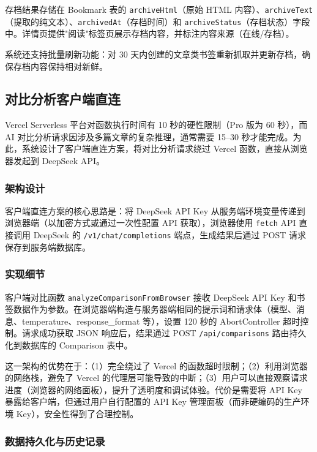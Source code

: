 \documentclass[12pt,a4paper]{ctexart}
\begin{document}
存档结果存储在 Bookmark 表的 \texttt{archiveHtml}（原始 HTML 内容）、\texttt{archiveText}（提取的纯文本）、\texttt{archivedAt}（存档时间）和 \texttt{archiveStatus}（存档状态）字段中。详情页提供"阅读"标签页展示存档内容，并标注内容来源（在线/存档）。

系统还支持批量刷新功能：对 30 天内创建的文章类书签重新抓取并更新存档，确保存档内容保持相对新鲜。

\subsection{对比分析客户端直连}

Vercel Serverless 平台对函数执行时间有 10 秒的硬性限制（Pro 版为 60 秒），而 AI 对比分析请求因涉及多篇文章的复杂推理，通常需要 15--30 秒才能完成。为此，系统设计了客户端直连方案，将对比分析请求绕过 Vercel 函数，直接从浏览器发起到 DeepSeek API。

\subsubsection{架构设计}

客户端直连方案的核心思路是：将 DeepSeek API Key 从服务端环境变量传递到浏览器端（以加密方式或通过一次性配置 API 获取），浏览器使用 \texttt{fetch} API 直接调用 DeepSeek 的 \texttt{/v1/chat/completions} 端点，生成结果后通过 POST 请求保存到服务端数据库。

\subsubsection{实现细节}

客户端对比函数 \texttt{analyzeComparisonFromBrowser} 接收 DeepSeek API Key 和书签数据作为参数。在浏览器端构造与服务器端相同的提示词和请求体（模型、消息、temperature、response\_format 等），设置 120 秒的 AbortController 超时控制。请求成功获取 JSON 响应后，结果通过 POST \texttt{/api/comparisons} 路由持久化到数据库的 Comparison 表中。

这一架构的优势在于：（1）完全绕过了 Vercel 的函数超时限制；（2）利用浏览器的网络栈，避免了 Vercel 的代理层可能导致的中断；（3）用户可以直接观察请求进度（浏览器的网络面板），提升了透明度和调试体验。代价是需要将 API Key 暴露给客户端，但通过用户自行配置的 API Key 管理面板（而非硬编码的生产环境 Key），安全性得到了合理控制。

\subsubsection{数据持久化与历史记录}
\end{document}

